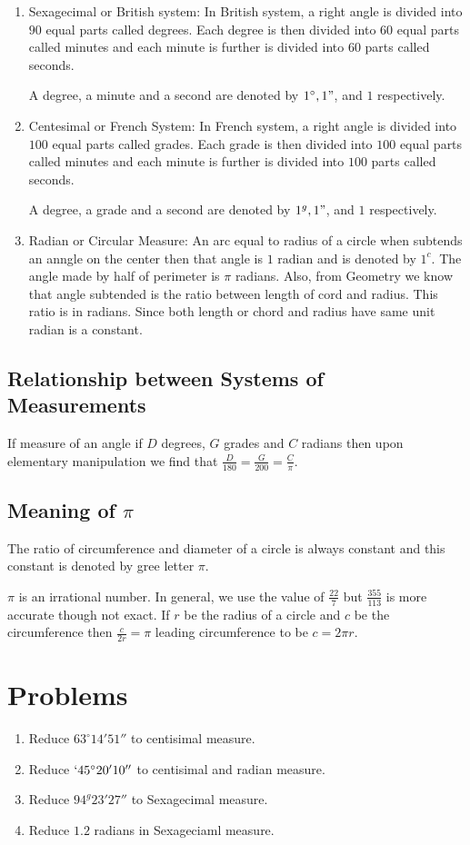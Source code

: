 \begin{enumerate}
\item Sexagecimal or British system: In British system, a right angle is divided into $90$ equal parts called degrees. Each degree
is then divided into $60$ equal parts called minutes and each minute is further is divided into $60$ parts called seconds.

A degree, a minute and a second are denoted by $1^\circ, 1"$, and $1$ respectively.
\item Centesimal or French System: In French system, a right angle is divided into $100$ equal parts called grades. Each grade is
then divided into $100$ equal parts called minutes and each minute is further is divided into $100$ parts called seconds.

A degree, a grade and a second are denoted by $1^g, 1"$, and $1$ respectively.
\item Radian or Circular Measure: An arc equal to radius of a circle when subtends an anngle on the center then that angle is $1$
radian and is denoted by $1^c$. The angle made by half of perimeter is $\pi$ radians. Also, from Geometry we know that angle subtended
is the ratio between length of cord and radius. This ratio is in radians. Since both length or chord and radius have same unit
radian is a constant.
\end{enumerate}

\subsection{Relationship between Systems of Measurements}
If measure of an angle if $D$ degrees, $G$ grades and $C$ radians then upon elementary manipulation we find that $\frac{D}{180}=
\frac{G}{200} = \frac{C}{\pi}$.

\subsection{Meaning of $\pi$}
The ratio of circumference and diameter of a circle is always constant and this constant is denoted by gree letter $\pi$.

$\pi$ is an irrational number. In general, we use the value of $\frac{22}{7}$ but $\frac{355}{113}$ is more accurate though not
exact. If $r$ be the radius of a circle and $c$ be the circumference then $\frac{c}{2r} =\pi$ leading circumference to be $c = 2\pi
r$.

\section{Problems}
\begin{enumerate}
\item Reduce $63^{\circ}14'51''$ to centisimal measure.
\item  Reduce $`45^{\circ}20'10''$ to centisimal and radian measure.
\item Reduce $94^g23'27''$ to Sexagecimal measure.
\item Reduce $1.2$ radians in Sexageciaml measure.
\end{enumerate}

